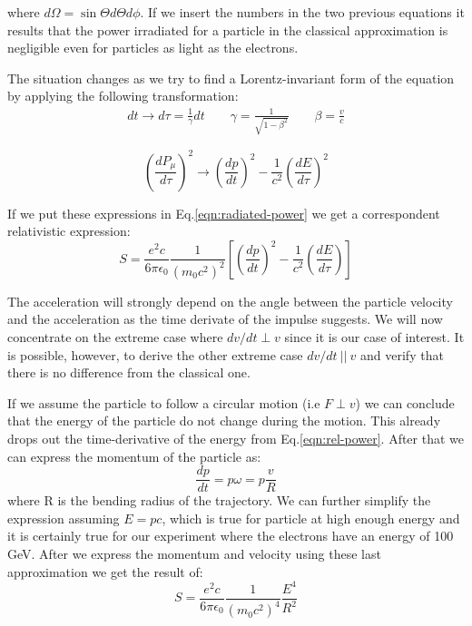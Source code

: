 where $d\Omega = \sin{\Theta} d\Theta d\phi$. If we insert the numbers in the two previous equations it results that the power irradiated for a particle in the classical approximation is negligible even for particles as light as the electrons.

The situation changes as we try to find a Lorentz-invariant form of the equation by applying the following transformation:
\begin{eqnarray}
dt \longrightarrow d\tau=\frac{1}{\gamma}dt \qquad
\gamma = \frac{1}{\sqrt{1-\beta^2}} \qquad \beta=\frac{v}{c}
\label{time_trans}
\end{eqnarray}

\begin{equation}
\left(\frac{dP_{\mu}}{d\tau}\right)^2 \longrightarrow \left(\frac{dp}{dt}\right)^2 - \frac{1}{c^2}\left(\frac{dE}{d\tau}\right)^2
\label{momentum-trans}
\end{equation}

If we put these expressions in Eq.\ref{eqn:radiated-power} we get a correspondent relativistic expression:
\begin{equation}
S = \frac{e^2c}{6\pi \epsilon_0}\frac{1}{(m_0c^2)^2 }\left[\left(\frac{dp}{dt}\right)^2 - \frac{1}{c^2}\left(\frac{dE}{d\tau}\right)\right]
\label{eqn:rel-power}
\end{equation}

The acceleration will strongly depend on the angle between the particle velocity and the acceleration as the time derivate of the impulse suggests. We will now concentrate on the extreme case where $dv/dt \perp v$ since it is our case of interest. It is possible, however, to derive the other extreme case $dv/dt~||~v$ and verify that there is no difference from the classical one. \par

If we assume the particle to follow a circular motion (i.e $F \perp v$) we can conclude that the energy of the particle do not change during the motion. This already drops out the time-derivative of the energy from Eq.\ref{eqn:rel-power}. After that we can express the momentum of the particle as:
\[\frac{dp}{dt} =p\omega = p \frac{v}{R}\]
where R is the bending radius of the trajectory. We can further simplify the expression assuming $E=pc$, which is true for particle at high enough energy and it is certainly true for our experiment where the electrons have an energy of 100 GeV. After we express the momentum and velocity using these last approximation we get the result of:
\begin{equation}
S = \frac{e^2c}{6\pi \epsilon_0}\frac{1}{(m_0c^2)^4 }\frac{E^4}{R^2}
\end{equation}

